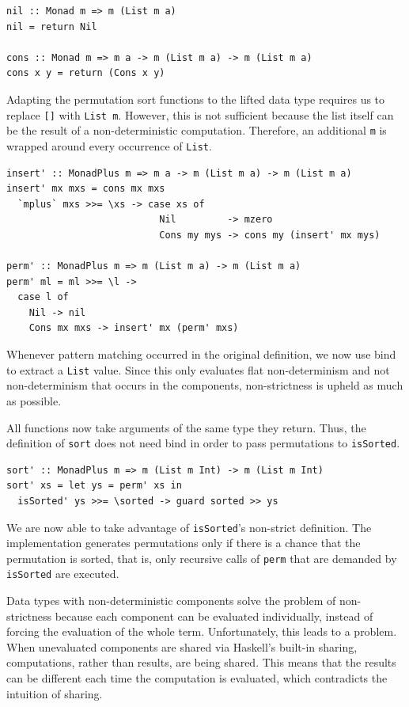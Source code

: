 \documentclass[a4paper, 11pt, fleqn, twoside]{scrreprt}
\begin{document}
\begin{verbatim}
nil :: Monad m => m (List m a)
nil = return Nil

cons :: Monad m => m a -> m (List m a) -> m (List m a)
cons x y = return (Cons x y)
\end{verbatim}

Adapting the permutation sort functions to the lifted data type requires us to 
replace \texttt{[]} with \texttt{List m}. However, 
this is not sufficient because the list itself can be the result of a 
non-deterministic computation. Therefore, an additional \texttt{m} 
is wrapped around every occurrence of \texttt{List}.

\begin{verbatim}
insert' :: MonadPlus m => m a -> m (List m a) -> m (List m a)
insert' mx mxs = cons mx mxs
  `mplus` mxs >>= \xs -> case xs of
                           Nil         -> mzero
                           Cons my mys -> cons my (insert' mx mys)

perm' :: MonadPlus m => m (List m a) -> m (List m a)
perm' ml = ml >>= \l ->
  case l of
    Nil -> nil
    Cons mx mxs -> insert' mx (perm' mxs)
\end{verbatim}

Whenever pattern matching occurred in the original definition, we now use bind 
to extract a \texttt{List} value. Since this only evaluates flat 
non-determinism and not non-determinism that occurs in the components, 
non-strictness is upheld as much as possible. 

All functions now take arguments of the same type they return. Thus, the 
definition of \texttt{sort} does not need bind in order to pass 
permutations to \texttt{isSorted}.

\begin{verbatim}
sort' :: MonadPlus m => m (List m Int) -> m (List m Int)
sort' xs = let ys = perm' xs in
  isSorted' ys >>= \sorted -> guard sorted >> ys
\end{verbatim}

We are now able to take advantage of \texttt{isSorted}'s non-strict
definition. The implementation generates permutations only if there is a chance 
that the permutation is sorted, that is, only recursive calls of 
\texttt{perm} that are demanded by \texttt{isSorted} 
are executed.

Data types with non-deterministic components solve the problem of 
non-strictness because each component can be evaluated individually, instead of 
forcing the evaluation of the whole term. Unfortunately, this leads to a 
problem. When unevaluated components are shared via Haskell's built-in sharing, 
computations, rather than results, are being shared. This means that the 
results can be different each time the computation is evaluated, which 
contradicts the intuition of sharing.
\end{document}
